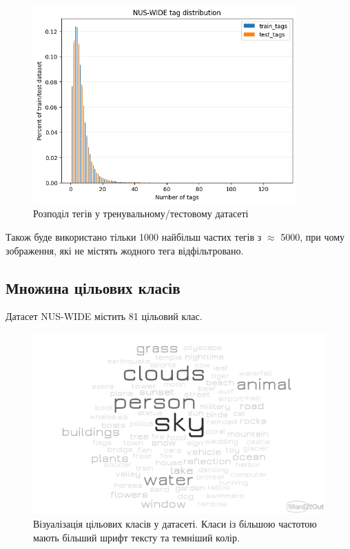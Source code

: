 \documentclass{udstu}
\begin{document}
\begin{figure}[!ht]
	\centering
	\includegraphics[width=0.9\textwidth]{PNG/nus-wide-tag-dist}
	\caption{Розподіл тегів у тренувальному/тестовому датасеті}
	\label{figure:nus-wide-dist}
\end{figure}

Також буде використано тільки 1000 найбільш частих тегів з $\approx$ 5000,
при чому зображення, які не містять жодного тега відфільтровано.

\clearpage

\subsection{Множина цільових класів}

Датасет NUS-WIDE \cite{nus-wide-civr09} містить 81 цільовий клас.

\begin{figure}[!ht]
	\centering
	\includegraphics[width=1.0\textwidth]{PNG/nus-wide-label-cloudmap}
	\caption{
	Візуалізація цільових класів у датасеті.
	Класи із більшою частотою мають більший шрифт тексту
	та темніший колір.
	}
	\label{figure:nus-wide-label-cloudmap}
\end{figure}
\end{document}
